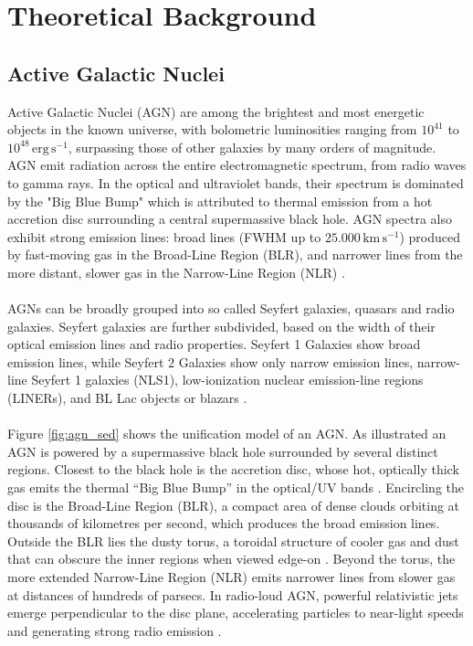 \chapter{Theoretical Background}

\section{Active Galactic Nuclei}

Active Galactic Nuclei (AGN) are among the brightest and most energetic objects in the known universe, with bolometric luminosities ranging from $10^{41}$ to $10^{48}\,\mathrm{erg\,s^{-1}}$, surpassing those of other galaxies by many orders of magnitude. AGN emit radiation across the entire electromagnetic spectrum, from radio waves to gamma rays. In the optical and ultraviolet bands, their spectrum is dominated by the "Big Blue Bump" which is attributed to thermal emission from a hot accretion disc surrounding a central supermassive black hole. AGN spectra also exhibit strong emission lines: broad lines (FWHM up to $25.000\,\mathrm{km\,s^{-1}}$) produced by fast-moving gas in the Broad-Line Region (BLR), and narrower lines from the more distant, slower gas in the Narrow-Line Region (NLR) \parencite{peterson1997introduction}.\\\\
AGNs can be broadly grouped into so called Seyfert galaxies, quasars and radio galaxies. Seyfert galaxies are further subdivided, based on the width of their optical emission lines and radio properties. Seyfert 1 Galaxies show broad emission lines, while Seyfert 2 Galaxies show only narrow emission lines, narrow-line Seyfert 1 galaxies (NLS1), low-ionization nuclear emission-line regions (LINERs), and BL Lac objects or blazars \parencite{antonucci1993unified,urry1995unified}.\\\\
Figure \ref{fig:agn_sed} shows the unification model of an AGN. 
As illustrated an AGN is powered by a supermassive black hole surrounded by several distinct regions. Closest to the black hole is the accretion disc, whose hot, optically thick gas emits the thermal “Big Blue Bump” in the optical/UV bands \parencite{peterson1997introduction}. Encircling the disc is the Broad-Line Region (BLR), a compact area of dense clouds orbiting at thousands of kilometres per second, which produces the broad emission lines. Outside the BLR lies the dusty torus, a toroidal structure of cooler gas and dust that can obscure the inner regions when viewed edge-on \parencite{antonucci1993unified}. Beyond the torus, the more extended Narrow-Line Region (NLR) emits narrower lines from slower gas at distances of hundreds of parsecs. In radio-loud AGN, powerful relativistic jets emerge perpendicular to the disc plane, accelerating particles to near-light speeds and generating strong radio emission \parencite{urry1995unified}.


